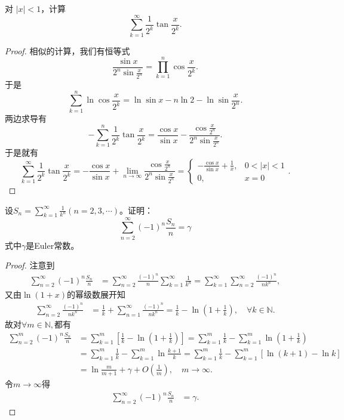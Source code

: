 \documentclass[../../main.tex]{subfiles}%
\begin{document}
\begin{example}
对 \(|x| < 1\)，计算
\[
\sum_{k=1}^{\infty} \frac{1}{2^k} \tan \frac{x}{2^k}.
\]
\end{example}
\begin{proof}

相似的计算，我们有恒等式
\[
\frac{\sin x}{2^n \sin \frac{x}{2^n}} = \prod_{k=1}^{n} \cos \frac{x}{2^k}.
\]
于是
\[
\sum_{k=1}^{n} \ln \cos \frac{x}{2^k}=\ln \sin x - n \ln 2 - \ln \sin \frac{x}{2^n}.
\]
两边求导有
\[
- \sum_{k=1}^{n} \frac{1}{2^k} \tan \frac{x}{2^k} = \frac{\cos x}{\sin x} - \frac{\cos \frac{x}{2^n}}{2^n \sin \frac{x}{2^n}}.
\]
于是就有
\[
\sum_{k=1}^{\infty} \frac{1}{2^k} \tan \frac{x}{2^k} = - \frac{\cos x}{\sin x} + \lim_{n \to \infty} \frac{\cos \frac{x}{2^n}}{2^n \sin \frac{x}{2^n}} = 
\begin{cases} 
- \frac{\cos x}{\sin x} + \frac{1}{x}, & 0 < |x| < 1 \\
0, & x = 0 
\end{cases}.
\]

\end{proof}

\begin{example}
设\(S_{n}=\sum_{k = 1}^{\infty}\frac{1}{k^{n}}(n = 2,3,\cdots)\)。证明：
\[
\sum_{n = 2}^{\infty}(-1)^{n}\frac{S_{n}}{n}=\gamma
\]
式中\(\gamma\)是Euler常数。
\end{example}
\begin{proof}

注意到
\begin{align*}
\sum_{n=2}^{\infty}{\left( -1 \right) ^n\frac{S_n}{n}}&=\sum_{n=2}^{\infty}{\frac{\left( -1 \right) ^n}{n}\sum_{k=1}^{\infty}{\frac{1}{k^n}}}=\sum_{k=1}^{\infty}{\sum_{n=2}^{\infty}{\frac{\left( -1 \right) ^n}{nk^n}}},
\end{align*}
又由$\ln \left( 1+x \right)$的幂级数展开知
\begin{align*}
\sum_{n=2}^{\infty}{\frac{\left( -1 \right) ^n}{nk^n}}&=\frac{1}{k}+\sum_{n=1}^{\infty}{\frac{\left( -1 \right) ^n}{nk^n}}=\frac{1}{k}-\ln \left( 1+\frac{1}{k} \right) ,\quad \forall k\in \mathbb{N} .
\end{align*}
故对$\forall m\in \mathbb{N} ,$都有
\begin{align*}
\sum_{n=2}^m{\left( -1 \right) ^n\frac{S_n}{n}}&=\sum_{k=1}^m{\left[ \frac{1}{k}-\ln \left( 1+\frac{1}{k} \right) \right]}=\sum_{k=1}^m{\frac{1}{k}}-\sum_{k=1}^m{\ln \left( 1+\frac{1}{k} \right)}\\
&=\sum_{k=1}^m{\frac{1}{k}}-\sum_{k=1}^m{\ln \frac{k+1}{k}}=\sum_{k=1}^m{\frac{1}{k}}-\sum_{k=1}^m{\left[ \ln \left( k+1 \right) -\ln k \right]}\\
&=\ln \frac{m}{m+1}+\gamma +O\left( \frac{1}{m} \right) ,\quad m\rightarrow \infty .
\end{align*}
令$m\rightarrow \infty$得
\begin{align*}
\sum_{n=2}^{\infty}{\left( -1 \right) ^n\frac{S_n}{n}}&=\gamma .
\end{align*}

\end{proof}
\end{document}
